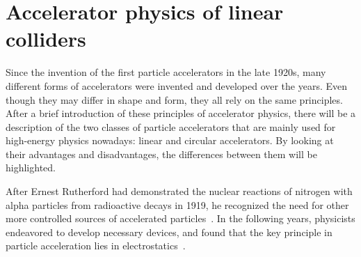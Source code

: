 \chapter{Accelerator physics of linear colliders}
\label{LinearColliderPhysics}

\begin{chapterabstract}
Since the invention of the first particle accelerators in the late 1920s, many different forms of accelerators were invented and developed over the years. 
Even though they may differ in shape and form, they all rely on the same principles. 
After a brief introduction of these principles of accelerator physics, there will be a description of the two classes of particle accelerators that are mainly used for high-energy physics nowadays: linear and circular accelerators. 
By looking at their advantages and disadvantages, the differences between them will be highlighted.
\end{chapterabstract}
\newline

After Ernest Rutherford had demonstrated the nuclear reactions of nitrogen with alpha particles from radioactive decays in 1919, he recognized the need for other more controlled sources of accelerated particles~\cite{Rutherford}.
In the following years, physicists endeavored to develop necessary devices, and found that the key principle in particle acceleration lies in electrostatics~\cite[p. 3f]{Livingston}.


